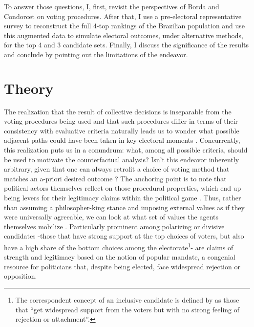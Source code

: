 \documentclass[hidelinks,11pt]{article}
\begin{document}
To answer those questions, I, first, revisit the perspectives of Borda and
Condorcet on voting procedures. After that, I use a pre-electoral representative
survey to reconstruct the full 4-top rankings of the Brazilian population and
use this augmented data to simulate electoral outcomes, under alternative
methods, for the top 4 and 3 candidate sets. Finally, I discuss the significance
of the results and conclude by pointing out the limitations of the endeavor.

\section{Theory}

The realization that the result of collective decisions is inseparable from the
voting procedures being used and that such procedures differ in terms of their
consistency with evaluative criteria naturally leads us to wonder what possible
adjacent paths could have been taken in key electoral moments
\parencite{tabarrok1999would, kaminski1999communism, ostrom1986agenda}.
Concurrently, this realization puts us in a conundrum: what, among all possible
criteria, should be used to motivate the counterfactual analysis? Isn't this
endeavor inherently arbitrary, given that one can always retrofit a choice of
voting method that matches an a-priori desired outcome
\parencite{riker1982liberalism}? The anchoring point is to note that political
actors themselves reflect on those procedural properties, which end up being
levers for their legitimacy claims within the political game
\parencite{mclean02_william_h, ostrom2009understanding}. Thus, rather than
assuming a philosopher-king stance and imposing external values as if they were
universally agreeable, we can look at what set of values the agents themselves
mobilize \parencite{binmore2005natural}. Particularly prominent among polarizing
or divisive candidates -those that have strong support at the top choices of
voters, but also have a high share of the bottom choices among the
electorate\footnote{The correspondent concept of an inclusive candidate is
  defined by \textcite[p.6]{igersheim22_compar_votin_method} as those that
  ``get widespread support from the voters but with no strong feeling of
  rejection or attachment''.}- are claims of strength and legitimacy based on
the notion of popular mandate, a congenial resource for politicians that,
despite being elected, face widespread rejection or opposition.
\end{document}
